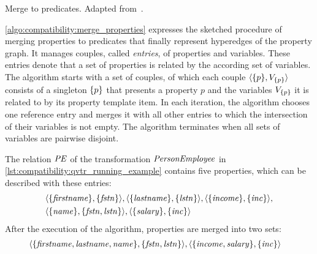 \begin{algorithm}
    
    \caption[Merge of properties to predicates]{Merge to predicates. Adapted from~.}
    \label{algo:compatibility:merge_properties}
\end{algorithm}

\autoref{algo:compatibility:merge_properties} expresses the sketched procedure of merging properties to predicates that finally represent hyperedges of the property graph.
It manages couples, called \emph{entries}, of properties and \qvtr variables.
These entries denote that a set of properties is related by the according set of \qvtr variables.
The algorithm starts with a set of couples, of which each couple $\langle \{ p \}, V_{\{ p \}} \rangle$ consists of a singleton $\{ p \}$ that presents a property $p$ and the \qvtr variables $V_{\{ p \}}$ it is related to by its property template item.
In each iteration, the algorithm chooses one reference entry and merges it with all other entries to which the intersection of their \qvtr variables is not empty.
The algorithm terminates when all sets of \qvtr variables are pairwise disjoint.

\begin{example}
The relation $\mathit{PE}$ of the \qvtr transformation $\mathit{PersonEmployee}$ in \autoref{lst:compatibility:qvtr_running_example} contains five properties, which can be described with these entries:
\begin{align*}
&
    \langle \{ \mathit{firstname} \}, \{ \mathit{fstn} \} \rangle, 
    \langle \{ \mathit{lastname} \}, \{ \mathit{lstn} \} \rangle,
    \langle \{ \mathit{income} \}, \{ \mathit{inc} \} \rangle, \\ 
&
    \langle \{ \mathit{name} \}, \{ \mathit{fstn}, \mathit{lstn} \} \rangle,
    \langle \{ \mathit{salary} \}, \{ \mathit{inc} \} \rangle
\end{align*}
After the execution of the algorithm, properties are merged into two sets:
\begin{align*}
&
    \langle \{ \mathit{firstname}, \mathit{lastname}, \mathit{name} \}, \{ \mathit{fstn}, \mathit{lstn} \} \rangle,
    \langle \{ \mathit{income}, \mathit{salary} \}, \{ \mathit{inc} \} \rangle
\end{align*}
\end{example}

